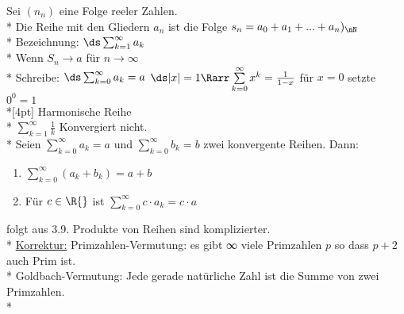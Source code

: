 %
%
Sei $(n_n)$ eine Folge reeler Zahlen.\\*
Die Reihe mit den Gliedern $a_n$ ist die Folge $s_n = a_0 + a_1 + ... + a_n)_\nN$ \\*
Bezeichnung: $\ds\sum_{k=1}^{\infty} a_k$\\*
Wenn $S_n \to a$ für $n \to \infty$\\*
Schreibe: $\ds\sum_{k = 0}^{\infty} a_k = a$
$\ds|x| = 1 \Rarr \sum\limits_{k = 0}^{\infty} x^k = \frac{1}{1-x}$ für $x = 0$ setzte $0^0 = 1$\\*[4pt]
Harmonische Reihe\\*
$\displaystyle\sum\limits_{k = 1}^{\infty} \frac{1}{k}$ Konvergiert nicht.\\*
Seien $\sum\limits_{k = 0}^{\infty} a_k = a$ und $\sum\limits_{k = 0}^{\infty} b_k = b$ zwei konvergente Reihen. Dann:
\begin{enumerate}
\item{$\sum\limits_{k = 0}^{\infty} (a_k + b_k) = a + b$}
\item{Für $c \in \R{}$ ist $\sum\limits_{k = 0}^{\infty} c \cdot a_k = c \cdot a$}
\end{enumerate}
\bew
folgt aus 3.9.
\bem
Produkte von Reihen sind komplizierter.\\*
\ul{Korrektur:}
Primzahlen-Vermutung: es gibt ∞ viele Primzahlen $p$ so dass $p + 2$ auch Prim ist.\\*
Goldbach-Vermutung: Jede gerade natürliche Zahl ist die Summe von zwei Primzahlen.\\*
